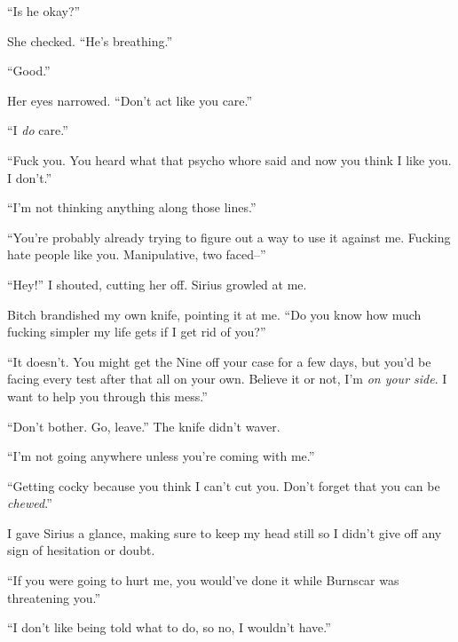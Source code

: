 ``Is he okay?''



She checked.  ``He's breathing.''



``Good.''



Her eyes narrowed. ``Don't act like you care.''



``I \emph{do} care.''



``Fuck you.  You heard what that psycho whore said and now you think I like you.  I don't.''



``I'm not thinking anything along those lines.''



``You're probably already trying to figure out a way to use it against me.  Fucking hate people like you.  Manipulative, two faced--''



``Hey!'' I shouted, cutting her off.  Sirius growled at me.



Bitch brandished my own knife, pointing it at me.  ``Do you know how much fucking simpler my life gets if I get rid of you?''



``It doesn't.  You might get the Nine off your case for a few days, but you'd be facing every test after that all on your own.  Believe it or not, I'm \emph{on your side}.  I want to help you through this mess.''



``Don't bother.  Go, leave.''  The knife didn't waver.



``I'm not going anywhere unless you're coming with me.''



``Getting cocky because you think I can't cut you.  Don't forget that you can be \emph{chewed}.''



I gave Sirius a glance, making sure to keep my head still so I didn't give off any sign of hesitation or doubt.



``If you were going to hurt me, you would've done it while Burnscar was threatening you.''



``I don't like being told what to do, so no, I wouldn't have.''



